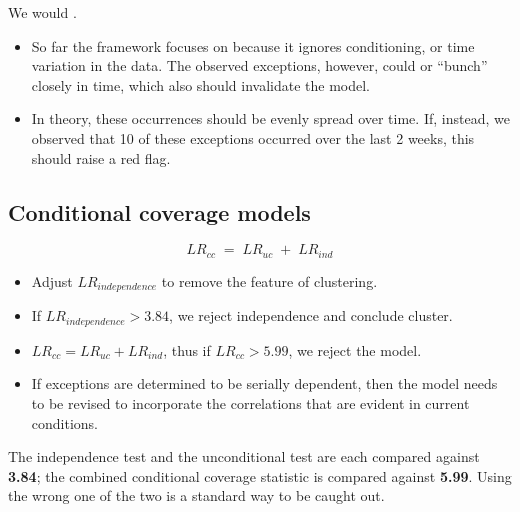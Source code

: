 \begin{mrkeybox}
We would .
\end{mrkeybox}


\begin{itemize}
\item So far the framework focuses on  because it ignores
      conditioning, or time variation in the data. The observed exceptions, however, could
       or ``bunch'' closely in time, which also should invalidate the model.
\item In theory, these occurrences should be evenly spread over time. If, instead, we observed
      that 10 of these exceptions occurred over the last 2 weeks, this should raise a red flag.
\end{itemize}

\subsection{Conditional coverage models}

\begin{mrfmlbox}
\[ LR_{cc} \;=\; LR_{uc} \;+\; LR_{ind} \]
\end{mrfmlbox}

\begin{itemize}
\item Adjust $LR_{independence}$ to remove the feature of clustering.
\item If $LR_{independence} > 3.84$, we reject independence and conclude cluster.
\item $LR_{cc} = LR_{uc} + LR_{ind}$, thus if $LR_{cc} > 5.99$, we reject the model.
\item If exceptions are determined to be serially dependent, then the model needs to be revised
      to incorporate the correlations that are evident in current conditions.
\end{itemize}

\begin{mrtrapbox}[title={Two different critical values}]
The independence test and the unconditional test are each compared against \textbf{3.84}; the
combined conditional coverage statistic is compared against \textbf{5.99}. Using the wrong one
of the two is a standard way to be caught out.
\end{mrtrapbox}

